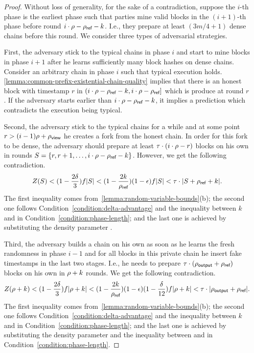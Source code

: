 \begin{proof}
    Without loss of generality, for the sake of a contradiction, suppose the $i$-th phase is the earliest phase such that parties mine valid blocks in the $(i + 1)$-th phase before round $i \cdot \rho - \rho_{\textsf{ref}} - k$.
    I.e., they prepare at least $(3m / 4 + 1)$ dense chains before this round.
    We consider three types of adversarial strategies.

    First, the adversary stick to the typical chains in phase $i$ and start to mine blocks in phase $i + 1$ after he learns sufficiently many block hashes on dense chains.
    Consider an arbitrary chain in phase $i$ such that typical execution holds.
    \cref{lemma:common-prefix-existential-chain-quality} implies that there is an honest block with timestamp $r$ in $(i \cdot \rho - \rho_{\textsf{ref}} - k, i \cdot \rho - \rho_{\textsf{ref}}]$ which is produce at round $r$.
    If the adversary starts earlier than $i \cdot \rho - \rho_{\textsf{ref}} - k$, it implies a prediction which contradicts the execution being typical.

    Second, the adversary stick to the typical chains for a while and at some point $r > (i - 1)\rho + \rho_{\textsf{view}}$ he creates a fork from the honest chain.
    In order for this fork to be dense, the adversary should prepare at least $\tau \cdot (i \cdot \rho  - r)$ blocks on his own in rounds $S = \{r, r + 1, \ldots, i \cdot \rho - \rho_{\textsf{ref}} - k\}$.
    However, we get the following contradiction.
    \[ Z(S) < (1 - \frac{2\delta}{3}) f |S| < (1 - \frac{2k}{\rho_{\textsf{ref}}})(1 - \epsilon) f |S| <  \tau \cdot |S + \rho_{\textsf{ref}} + k|. \]
    The first inequality comes from~\cref{lemma:random-variable-bounds}(b); the second one follows Condition~\eqref{condition:delta-advantage} and the inequality between $k$ and \phaseRefLength in Condition~\eqref{condition:phase-length}; and the last one is achieved by substituting the density parameter \densityParam.

    Third, the adversary builds a chain on his own as soon as he learns the fresh randomness in phase $i - 1$ and for all blocks in this private chain he insert fake timestamps in the last two stages.
    I.e., he needs to prepare $\tau \cdot (\rho_{\textsf{output}} + \rho_{\textsf{ref}})$ blocks on his own in $\rho + k$ rounds.
    We get the following contradiction.
    \[ Z(\rho + k) < (1 - \frac{2\delta}{3}) f |\rho + k| < (1 - \frac{2k}{\rho_{\textsf{ref}}})(1 - \epsilon)(1 - \frac{\delta}{12}) f |\rho + k| <  \tau \cdot |\rho_{\textsf{output}} + \rho_{\textsf{ref}}|. \]
    The first inequality comes from~\cref{lemma:random-variable-bounds}(b); the second one follows Condition~\eqref{condition:delta-advantage} and the inequality between $k$ and \phaseRefLength in Condition~\eqref{condition:phase-length}; and the last one is achieved by substituting the density parameter \densityParam and the inequality between \phaseViewLength and \phaseOutputLength in Condition~\eqref{condition:phase-length}.
\end{proof}

